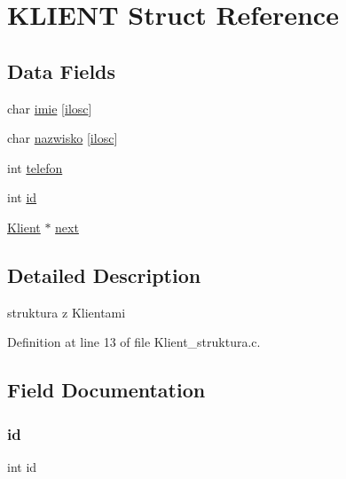 \hypertarget{struct_k_l_i_e_n_t}{}\section{K\+L\+I\+E\+NT Struct Reference}
\label{struct_k_l_i_e_n_t}
\subsection*{Data Fields}
\begin{DoxyCompactItemize}
\item 
char \hyperlink{struct_k_l_i_e_n_t_a278dd55fda880fda278c6f0fc990c152}{imie} \mbox{[}\hyperlink{_wypozyczenie__struktura_8c_a802c84452854799df868a4a660d3d58a}{ilosc}\mbox{]}
\item 
char \hyperlink{struct_k_l_i_e_n_t_a44099732d2d6bd00bfec0bdaadac3a35}{nazwisko} \mbox{[}\hyperlink{_wypozyczenie__struktura_8c_a802c84452854799df868a4a660d3d58a}{ilosc}\mbox{]}
\item 
int \hyperlink{struct_k_l_i_e_n_t_a5b8eb8a4fce24d6eff5339e869d2ac34}{telefon}
\item 
int \hyperlink{struct_k_l_i_e_n_t_a7441ef0865bcb3db9b8064dd7375c1ea}{id}
\item 
\hyperlink{_klient__struktura_8c_afe8e3fcee1af6d1ee1c5346ef4a09cbf}{Klient} $\ast$ \hyperlink{struct_k_l_i_e_n_t_a7ba03f25bcbff6f0f2c5bc506ec76f7b}{next}
\end{DoxyCompactItemize}


\subsection{Detailed Description}
struktura z Klientami 

Definition at line 13 of file Klient\+\_\+struktura.\+c.



\subsection{Field Documentation}
\mbox{\label{struct_k_l_i_e_n_t_a7441ef0865bcb3db9b8064dd7375c1ea}} 
\subsubsection{\texorpdfstring{id}{id}}
{\footnotesize\ttfamily int id}



